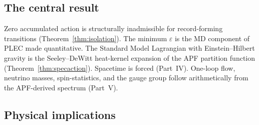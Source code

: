 \documentclass[11pt]{article}
\theoremstyle{definition}
\begin{document}
\subsection{The central result}
Zero accumulated action is structurally inadmissible for record-forming transitions (Theorem~\ref{thm:isolation}).  The minimum $\varepsilon$ is the MD component of PLEC made quantitative.  The Standard Model Lagrangian with Einstein--Hilbert gravity is the Seeley--DeWitt heat-kernel expansion of the APF partition function (Theorem~\ref{thm:specaction}).  Spacetime is forced (Part~IV).  One-loop flow, neutrino masses, spin-statistics, and the gauge group follow arithmetically from the APF-derived spectrum (Part~V).

\subsection{Physical implications}
\end{document}
